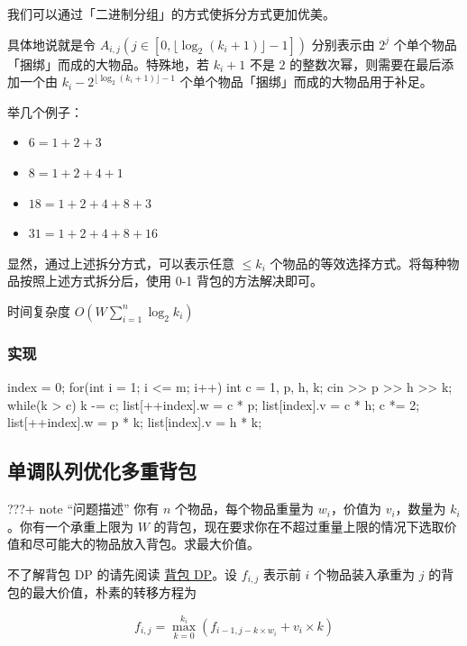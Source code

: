 我们可以通过「二进制分组」的方式使拆分方式更加优美。

具体地说就是令 \(A_{i,j}\left(j\in\left[0,\lfloor \log_2(k_i+1)\rfloor-1\right]\right)\) 分别表示由 \(2^{j}\) 个单个物品「捆绑」而成的大物品。特殊地，若 \(k_i+1\) 不是 \(2\) 的整数次幂，则需要在最后添加一个由 \(k_i-2^{\lfloor \log_2(k_i+1)\rfloor-1}\) 个单个物品「捆绑」而成的大物品用于补足。

举几个例子：

\begin{itemize}
\tightlist
\item
  \(6=1+2+3\)
\item
  \(8=1+2+4+1\)
\item
  \(18=1+2+4+8+3\)
\item
  \(31=1+2+4+8+16\)
\end{itemize}

显然，通过上述拆分方式，可以表示任意 \(\le k_i\) 个物品的等效选择方式。将每种物品按照上述方式拆分后，使用 0-1 背包的方法解决即可。

时间复杂度 \(O(W\sum_{i=1}^n\log_2k_i)\)

\subsubsection{实现}\label{ux5b9eux73b0-1}


\begin{codeline}
index = 0;
for(int i = 1; i <= m; i++) {
    int c = 1, p, h, k;
    cin >> p >> h >> k;
    while(k > c) {
        k -= c;
        list[++index].w = c * p;
        list[index].v = c * h;
        c *= 2;
    }
    list[++index].w = p * k;
    list[index].v = h * k;
}
\end{codeline}


\subsection{单调队列优化多重背包}\label{ux5355ux8c03ux961fux5217ux4f18ux5316ux591aux91cdux80ccux5305}

???+ note ``问题描述'' 你有 \(n\) 个物品，每个物品重量为 \(w_i\)，价值为 \(v_i\)，数量为 \(k_i\)。你有一个承重上限为 \(W\) 的背包，现在要求你在不超过重量上限的情况下选取价值和尽可能大的物品放入背包。求最大价值。

不了解背包 DP 的请先阅读 \href{../knapsack.md}{背包 DP}。设 \(f_{i,j}\) 表示前 \(i\) 个物品装入承重为 \(j\) 的背包的最大价值，朴素的转移方程为

\[
f_{i,j}=\max_{k=0}^{k_i}(f_{i-1,j-k\times w_i}+v_i\times k)
\]

